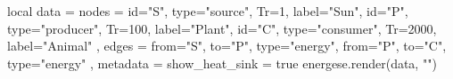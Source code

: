 \documentclass{standalone}
\begin{document}
\begin{luacode*}
    local data = {
        nodes = {
            {id="S", type="source", Tr=1, label="Sun"},
            {id="P", type="producer", Tr=100, label="Plant"},
            {id="C", type="consumer", Tr=2000, label="Animal"}
        },
        edges = {
            {from="S", to="P", type="energy"},
            {from="P", to="C", type="energy"}
        },
        metadata = {
            show_heat_sink = true
        }
    }
    energese.render(data, "")
\end{luacode*}
\end{document}
